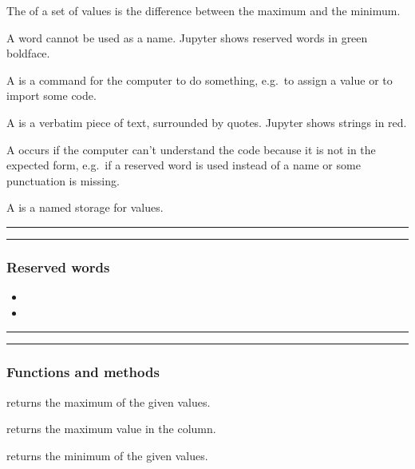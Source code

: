 \documentclass[letterpaper,10pt,english]{sphinxmanual}
\begin{document}
The  of a set of values is the difference between the maximum and the minimum.

A  word cannot be used as a name. Jupyter shows reserved words in green boldface.

A  is a command for the computer to do something, e.g. to assign a value or to import some code.

A  is a verbatim piece of text, surrounded by quotes. Jupyter shows strings in red.

A  occurs if the computer can’t understand the code because it is not in the expected form, e.g. if a reserved word is used instead of a name or some punctuation is missing.

A  is a named storage for values.


\bigskip\hrule\bigskip



\bigskip\hrule\bigskip



\subsubsection{Reserved words}
\label{\detokenize{content/session_02/Part_02_04:Reserved-words}}\begin{itemize}
\item {} 

\item {} 

\end{itemize}


\bigskip\hrule\bigskip



\bigskip\hrule\bigskip



\subsubsection{Functions and methods}
\label{\detokenize{content/session_02/Part_02_04:Functions-and-methods}}
 returns the maximum of the given values.

 returns the maximum value in the column.

 returns the minimum of the given values.
\end{document}
